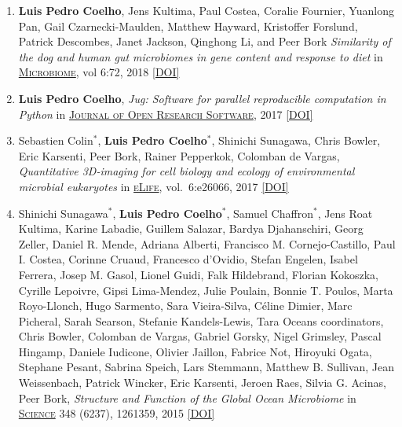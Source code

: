 \documentclass{article}
\newcommand\showdoi[1]{%
    \href{http://dx.doi.org/#1}{[DOI]}%
}
\newcommand\pubname[1]{\textsc{\uline{#1}}}
\newcommand\contribution[1]{\relax}
\newcommand\costar{${}^{*}$}
\begin{document}
\begin{enumerate}[resume]
\item \textbf{Luis Pedro Coelho}, Jens Kultima, Paul Costea, Coralie Fournier,
Yuanlong Pan, Gail Czarnecki-Maulden, Matthew Hayward, Kristoffer Forslund,
Patrick Descombes, Janet Jackson, Qinghong Li, and Peer Bork \emph{Similarity
of the dog and human gut microbiomes in gene content and response to diet} in
\pubname{Microbiome}, vol 6:72, 2018 \showdoi{10.1186/s40168-018-0450-3}
\contribution{I designed and implemented the analysis strategy, wrote the first
version of the manuscript, and lead the subsequent incorporation of co-author
suggestions.}

\item \textbf{Luis Pedro Coelho}, \emph{Jug: Software for parallel reproducible
computation in Python} in \pubname{Journal of Open Research
Software}, 2017 \showdoi{10.5334/jors.161}
\contribution{I designed and implemented the software presented and wrote the
manuscript.}

\item Sebastien Colin\costar, \textbf{Luis Pedro Coelho}\costar, Shinichi
Sunagawa, Chris Bowler, Eric Karsenti, Peer Bork, Rainer Pepperkok, Colomban de
Vargas, \emph{Quantitative 3D-imaging for cell biology and ecology of
environmental microbial eukaryotes} in \pubname{eLife}, vol.\ 6:e26066, 2017
\showdoi{10.7554/eLife.26066.001}
\contribution{I designed and implemented the computational analysis necessary
for the method presented in the paper and participated in the writing of the
manuscript.}

\item Shinichi Sunagawa\costar, \textbf{Luis Pedro Coelho}\costar, Samuel
Chaffron\costar, Jens Roat Kultima, Karine Labadie, Guillem Salazar, Bardya
Djahanschiri, Georg Zeller, Daniel R. Mende, Adriana Alberti, Francisco M.
Cornejo-Castillo, Paul I. Costea, Corinne Cruaud, Francesco d'Ovidio, Stefan
Engelen, Isabel Ferrera, Josep M. Gasol, Lionel Guidi, Falk Hildebrand, Florian
Kokoszka, Cyrille Lepoivre, Gipsi Lima-Mendez, Julie Poulain, Bonnie T. Poulos,
Marta Royo-Llonch, Hugo Sarmento, Sara Vieira-Silva, Céline Dimier, Marc
Picheral, Sarah Searson, Stefanie Kandels-Lewis, Tara Oceans coordinators,
Chris Bowler, Colomban de Vargas, Gabriel Gorsky, Nigel Grimsley, Pascal
Hingamp, Daniele Iudicone, Olivier Jaillon, Fabrice Not, Hiroyuki Ogata,
Stephane Pesant, Sabrina Speich, Lars Stemmann, Matthew B. Sullivan, Jean
Weissenbach, Patrick Wincker, Eric Karsenti, Jeroen Raes, Silvia G. Acinas,
Peer Bork, \emph{Structure and Function of the Global Ocean Microbiome} in
\pubname{Science} 348 (6237), 1261359, 2015 \showdoi{10.1126/science.1261359}
\contribution{As co-first author, I performed analysis of the data, including
linking the metagenomics data to the environmental parameters, as well as the
comparison to the human gut (this required extending existing software tools
which were unable to scale to this dataset); and helped draft the manuscript.}


\end{enumerate}
\end{document}
